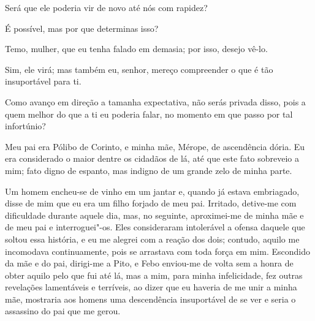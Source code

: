    Será que ele poderia vir de novo até nós com rapidez?

   É possível, mas por que determinas isso?

   Temo, mulher, que eu tenha falado em demasia; por isso, desejo vê-lo.

   Sim, ele virá; mas também eu, senhor, mereço compreender o que é
tão insuportável para ti.

   Como avanço em direção a tamanha expectativa, não serás privada disso,
pois a quem melhor do que a ti eu poderia falar, no momento em que passo
por tal infortúnio?

Meu pai era Pólibo de Corinto, e minha mãe, Mérope, de ascendência
dória. Eu era considerado o maior dentre os cidadãos de lá, até que este
fato sobreveio a mim; fato digno de espanto, mas indigno de um grande
zelo de minha parte.

 Um homem encheu-se de vinho em um jantar e, quando já estava
embriagado, disse de mim que eu era um filho forjado de meu pai.
Irritado, detive-me com dificuldade durante aquele dia, mas, no
seguinte, aproximei-me de minha mãe e de meu pai e interroguei"-os. Eles
consideraram intolerável a ofensa daquele que soltou essa história, e eu
me alegrei com a reação dos dois; contudo, aquilo me incomodava
continuamente, pois se arrastava com toda força em mim. Escondido da
mãe e do pai, dirigi-me a Pito, e Febo enviou-me de volta sem a honra de
obter aquilo pelo que fui até lá, mas a mim, para minha
infelicidade, fez outras revelações lamentáveis e terríveis, ao dizer
que eu haveria de me unir a minha mãe, mostraria aos homens uma
descendência insuportável de se ver e seria o assassino do pai que me
gerou.

